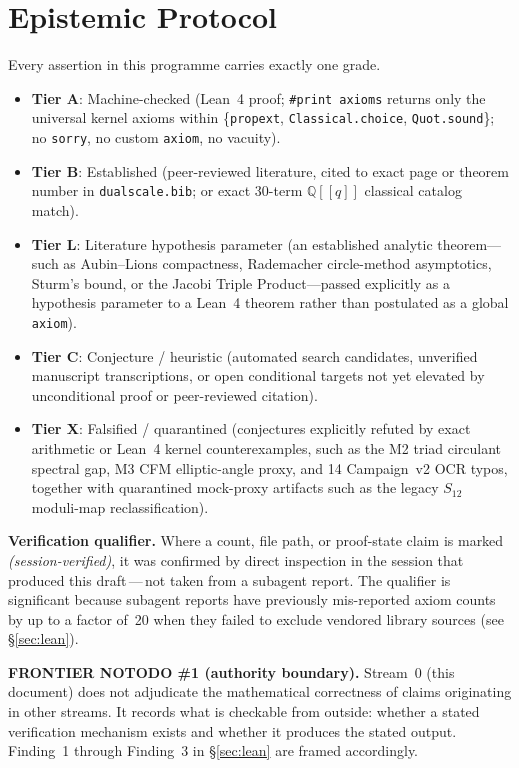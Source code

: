 \documentclass[11pt,a4paper]{article}
\theoremstyle{plain}
\theoremstyle{definition}
\theoremstyle{remark}
\begin{document}
\section{Epistemic Protocol}\label{sec:protocol}
Every assertion in this programme carries exactly one grade.
\begin{itemize}
    \item \textbf{Tier A}: Machine-checked (Lean~4 proof; \texttt{\#print axioms} returns
          only the universal kernel axioms within \{\texttt{propext},
          \texttt{Classical.choice}, \texttt{Quot.sound}\}; no \texttt{sorry},
          no custom \texttt{axiom}, no vacuity).
    \item \textbf{Tier B}: Established (peer-reviewed literature, cited to
          exact page or theorem number in \texttt{dualscale.bib}; or exact
          30-term $\mathbb{Q}[[q]]$ classical catalog match).
    \item \textbf{Tier L}: Literature hypothesis parameter (an established
          analytic theorem---such as Aubin--Lions compactness, Rademacher
          circle-method asymptotics, Sturm's bound, or the Jacobi Triple
          Product---passed explicitly as a hypothesis parameter to a Lean~4
          theorem rather than postulated as a global \texttt{axiom}).
    \item \textbf{Tier C}: Conjecture / heuristic (automated search candidates,
          unverified manuscript transcriptions, or open conditional targets
          not yet elevated by unconditional proof or peer-reviewed citation).
    \item \textbf{Tier X}: Falsified / quarantined (conjectures explicitly
          refuted by exact arithmetic or Lean~4 kernel counterexamples, such as
          the M2 triad circulant spectral gap, M3 CFM elliptic-angle proxy, and
          14 Campaign~v2 OCR typos, together with quarantined mock-proxy
          artifacts such as the legacy $S_{12}$ moduli-map reclassification).
\end{itemize}

\noindent
\textbf{Verification qualifier.}
Where a count, file path, or proof-state claim is marked
\emph{(session-verified)}, it was confirmed by direct inspection in the
session that produced this draft\,---\,not taken from a subagent report.
The qualifier is significant because subagent reports have previously
mis-reported axiom counts by up to a factor of~20 when they failed to
exclude vendored library sources (see §\ref{sec:lean}).

\noindent
\textbf{FRONTIER NOTODO \#1 (authority boundary).}
Stream~0 (this document) does not adjudicate the mathematical correctness
of claims originating in other streams.
It records what is checkable from outside: whether a stated verification
mechanism exists and whether it produces the stated output.
Finding~1 through Finding~3 in §\ref{sec:lean} are framed accordingly.
\end{document}

